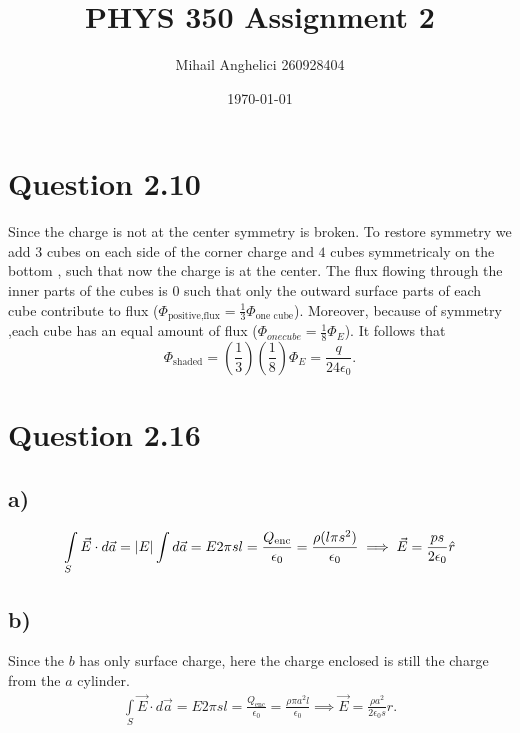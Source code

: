 \documentclass[
	12pt,
	]{article}
\title{PHYS 350 Assignment 2}
\author{Mihail Anghelici 260928404 }
\date{\today}
\newcommand{\ep}{\epsilon}
\theoremstyle{definition}
\theoremstyle{definition}
\theoremstyle{definition}
\theoremstyle{definition}
\theoremstyle{definition}
\theoremstyle{example}
\theoremstyle{note}
\theoremstyle{remark}
\theoremstyle{example}
\begin{document}
	\maketitle
		\section*{Question 2.10}
			Since the charge is not at the center symmetry is broken. To restore symmetry we add $3$ cubes on each side of the corner charge and $4$ cubes symmetricaly on the bottom , such that now the charge is at the center. The flux flowing through the inner parts of the cubes is $0$ such that only the outward surface parts of each cube contribute to flux ($\Phi_{\text{positive,flux}} = \frac13 \Phi_{\text{one cube}}$). Moreover, because of symmetry ,each cube has an equal amount of flux ($\Phi_{one cube} = \frac18 \Phi_{E}$). It follows that 
			$$ \Phi_{\text{shaded}} = \left(\frac13\right) \left(\frac18\right) \Phi_{E} = \frac{q}{24 \ep_{0}}.$$
			
		\section*{Question 2.16}
			\subsection*{a) }
				\begin{align*}
					\int\limits_{S} \vec{E} \cdot d\vec{a} =\abs{E} \int d\vec{a} = E 2\pi s l = \frac{Q_{\text{enc}}}{\ep_{0}} = \frac{\rho(l\pi s^{2})}{\ep_{0}} \implies \vec{E} = \frac{ps}{2\ep_{0}} \hat{r}
				\end{align*}
			\subsection*{b) }
				Since the $b$ has only surface charge, here the charge enclosed is still the charge from the $a$ cylinder.
				\begin{align*}
					\int\limits_{S} \vec{E} \cdot d\vec{a} = E 2\pi sl = \frac{Q_{\text{enc}}}{\ep_{0}} = \frac{\rho \pi a^{2} l }{\ep_{0}} \implies \vec{E} = \frac{\rho a^{2}}{2 \ep_{0} s} \hat{r}. 
				\end{align*} 
\end{document}

